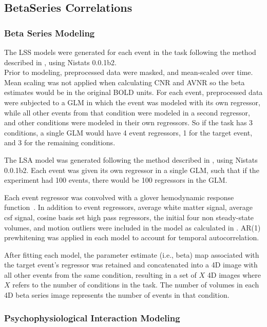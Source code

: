 \documentclass[phd,appendix,figures]{uithesis}
\begin{document}
\subsection*{BetaSeries Correlations}
\label{methods:bsc2}

\subsubsection*{Beta Series Modeling}
\label{methods:bsc_model2}

The LSS models were generated for each event in
the task following the method described in \cite[Turner (2012)]{Turner2012a}, using
Nistats 0.0.1b2.\\
Prior to modeling, preprocessed data were masked, and mean-scaled over
time.
Mean scaling was not applied when calculating CNR and AVNR so the
beta estimates would be in the original BOLD units.
For each event, preprocessed data were subjected to a GLM
in which the event was modeled with its own regressor, while
all other events from that condition were modeled in a second regressor,
and other conditions were modeled in their own regressors.
So if the task has 3 conditions, 
a single GLM would have 4 event regressors, 1 for the target
event, and 3 for the remaining conditions.

The LSA model was generated following the method described in
\cite[Rissman (2004)]{Rissman2004}, using Nistats 0.0.1b2.
Each event was given its own regressor in a single GLM, such that
if the experiment had 100 events, there would be 100 regressors in the GLM.

Each event regressor was convolved with a glover hemodynamic response
function~\cite{Glover1999}.
In addition to event regressors, average white matter signal, average csf signal,
cosine basis set high pass regressors, the initial four non steady-state volumes, 
and motion outliers were included
in the model as calculated in .
AR(1) prewhitening was applied in each model to account
for temporal autocorrelation.

After fitting each model, the parameter estimate (i.e., beta) map
associated with the target event's regressor was retained and
concatenated into a 4D image with all other events from the same
condition, resulting in a set of $X$ 4D images where $X$ refers to the
number of conditions in the task.
The number of volumes in each 4D beta series image
represents the number of events in that condition.


\subsubsection*{Psychophysiological Interaction Modeling}
\end{document}
